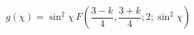 \begin{equation}
g(\chi) = \sin^2{\chi} \, F\left(\frac{3-k}{4}, \frac{3+k}{4}; 2; \sin^2{\chi} \right)
\end{equation}

